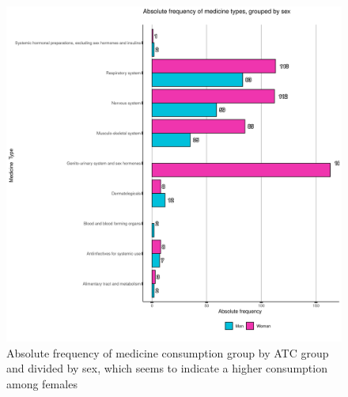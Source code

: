     \begin{figure}[H]
        \centering
            \includegraphics[width=0.9\linewidth]{figures/Results/ResultFour/CombinedLongAbsBarPlot_typesBySex_Type_Sex.png } 
        \caption{Absolute frequency of medicine consumption group by ATC group and divided by sex, which seems to indicate a higher consumption among females}
        \label{figure:Results4Diseases}
    \end{figure}

